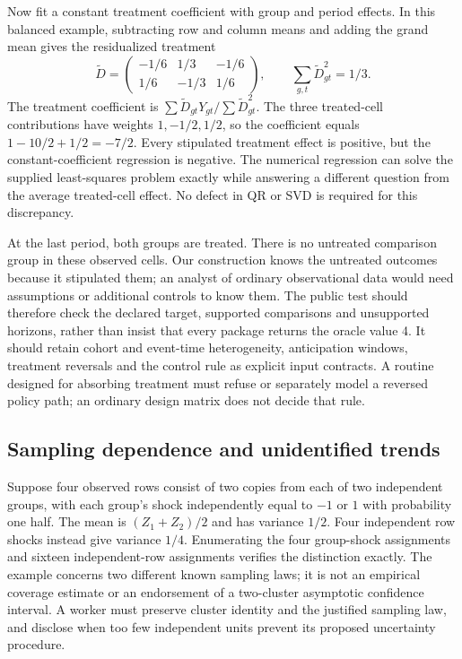 Now fit a constant treatment coefficient with group and period effects. In
this balanced example, subtracting row and column means and adding the grand
mean gives the residualized treatment
\[
\widetilde D=
\begin{pmatrix}-1/6&1/3&-1/6\\1/6&-1/3&1/6\end{pmatrix},
\qquad \sum_{g,t}\widetilde D_{gt}^2=1/3.
\]
The treatment coefficient is $\sum\widetilde D_{gt}Y_{gt}/
\sum\widetilde D_{gt}^2$. The three treated-cell contributions have weights
$1,-1/2,1/2$, so the coefficient equals
$1-10/2+1/2=-7/2$. Every stipulated treatment effect is positive, but the
constant-coefficient regression is negative. The numerical regression can
solve the supplied least-squares problem exactly while answering a different
question from the average treated-cell effect. No defect in QR or SVD is
required for this discrepancy.~\citep{exec25_paneljava_reference}

At the last period, both groups are treated. There is no untreated comparison
group in these observed cells. Our construction knows the untreated outcomes
because it stipulated them; an analyst of ordinary observational data would
need assumptions or additional controls to know them. The public test should
therefore check the declared target, supported comparisons and unsupported
horizons, rather than insist that every package returns the oracle value 4.
It should retain cohort and event-time heterogeneity, anticipation windows,
treatment reversals and the control rule as explicit input contracts.
A routine designed for absorbing treatment must refuse or separately model
a reversed policy path; an ordinary design matrix does not decide that rule.
\citep{exec25_paneljava_reference}

\subsection{Sampling dependence and unidentified trends}
Suppose four observed rows consist of two copies from each of two independent
groups, with each group's shock independently equal to $-1$ or $1$ with
probability one half. The mean is $(Z_1+Z_2)/2$ and has variance $1/2$.
Four independent row shocks instead give variance $1/4$. Enumerating the
four group-shock assignments and sixteen independent-row assignments verifies
the distinction exactly. The example concerns two different known sampling
laws; it is not an empirical coverage estimate or an endorsement of a
two-cluster asymptotic confidence interval. A worker must preserve cluster
identity and the justified sampling law, and disclose when too few independent
units prevent its proposed uncertainty procedure.
\citep{exec25_paneljava_reference}

